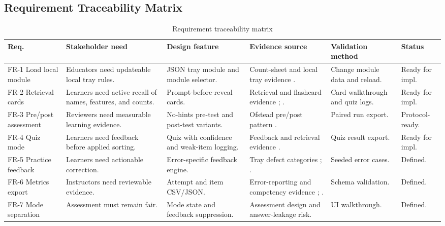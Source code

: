 \documentclass[10pt,a4paper]{article}
\begin{document}
\subsection{Requirement Traceability Matrix}


\begin{table}[H]
\centering
\caption{Requirement traceability matrix}
\label{tab:requirement-traceability-matrix}
\small\renewcommand{\arraystretch}{1.15}\setlength{\tabcolsep}{3pt}
\begin{tabularx}{\textwidth}{|>{\raggedright\arraybackslash}p{1.5cm}|>{\raggedright\arraybackslash}X|>{\raggedright\arraybackslash}X|>{\raggedright\arraybackslash}p{2.5cm}|>{\raggedright\arraybackslash}p{2.3cm}|>{\raggedright\arraybackslash}p{1.7cm}|}
\hline
Req. & Stakeholder need & Design feature & Evidence source & Validation method & Status \\
\hline
FR-1 Load local module & Educators need updateable local tray rules. & JSON tray module and module selector. & Count-sheet and local tray evidence \cite{nadeau-2024}. & Change module data and reload. & Ready for impl. \\
\hline
FR-2 Retrieval cards & Learners need active recall of names, features, and counts. & Prompt-before-reveal cards. & Retrieval and flashcard evidence \cite{roediger-and-karpicke-2006}; \cite{barrison-et-al-2025}. & Card walkthrough and quiz logs. & Ready for impl. \\
\hline
FR-3 Pre/post assessment & Reviewers need measurable learning evidence. & No-hints pre-test and post-test variants. & Ofstead pre/post pattern \cite{ofstead-et-al-2023}. & Paired run export. & Protocol-ready. \\
\hline
FR-4 Quiz mode & Learners need feedback before applied sorting. & Quiz with confidence and weak-item logging. & Feedback and retrieval evidence \cite{hattie-and-timperley-2007}. & Quiz result export. & Ready for impl. \\
\hline
FR-5 Practice feedback & Learners need actionable correction. & Error-specific feedback engine. & Tray defect categories \cite{alfred-et-al-2021}; \cite{nichol-et-al-2024}. & Seeded error cases. & Defined. \\
\hline
FR-6 Metrics export & Instructors need reviewable evidence. & Attempt and item CSV/JSON. & Error-reporting and competency evidence \cite{nichol-et-al-2024}; \cite{ofstead-et-al-2023}. & Schema validation. & Defined. \\
\hline
FR-7 Mode separation & Assessment must remain fair. & Mode state and feedback suppression. & Assessment design and answer-leakage risk. & UI walkthrough. & Defined. \\

\end{tabularx}
\end{table}
\end{document}
